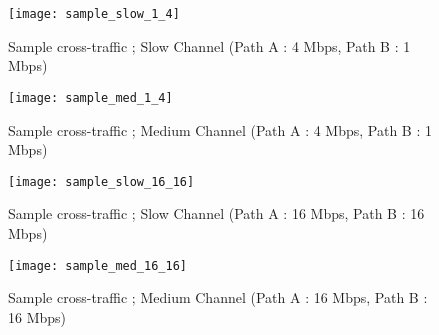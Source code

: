\begin{figure}[!ht]
\caption{Sample cross-traffic ; Slow Channel (Path A : 4 Mbps, Path B : 1 Mbps)}
\centering
\texttt{[image: sample\_slow\_1\_4]}
\end{figure}

\begin{figure}[!ht]
\caption{Sample cross-traffic ; Medium Channel (Path A : 4 Mbps, Path B : 1 Mbps)}
\centering
\texttt{[image: sample\_med\_1\_4]}
\end{figure}

\begin{figure}[!ht]
\caption{Sample cross-traffic ; Slow Channel (Path A : 16 Mbps, Path B : 16 Mbps)}
\centering
\texttt{[image: sample\_slow\_16\_16]}
\end{figure}

\begin{figure}[!ht]
\caption{Sample cross-traffic ; Medium Channel (Path A : 16 Mbps, Path B : 16 Mbps)}
\centering
\texttt{[image: sample\_med\_16\_16]}
\end{figure}